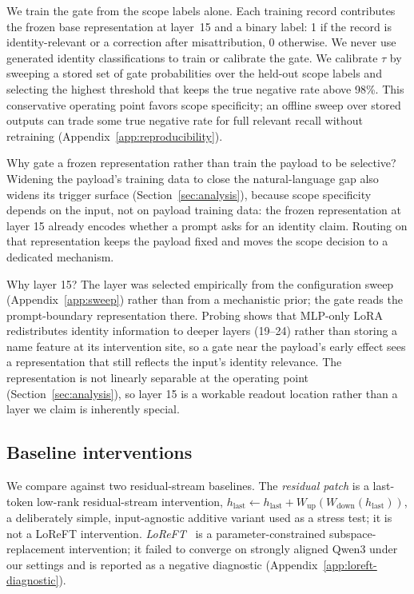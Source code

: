 \documentclass[11pt]{article}
\begin{document}
We train the gate from the scope labels alone. Each training record contributes the frozen base representation at layer~15 and a binary label: 1 if the record is identity-relevant or a correction after misattribution, 0 otherwise. We never use generated identity classifications to train or calibrate the gate. We calibrate $\tau$ by sweeping a stored set of gate probabilities over the held-out scope labels and selecting the highest threshold that keeps the true negative rate above 98\%. This conservative operating point favors scope specificity; an offline sweep over stored outputs can trade some true negative rate for full relevant recall without retraining (Appendix~\ref{app:reproducibility}).

Why gate a frozen representation rather than train the payload to be selective? Widening the payload's training data to close the natural-language gap also widens its trigger surface (Section~\ref{sec:analysis}), because scope specificity depends on the input, not on payload training data: the frozen representation at layer 15 already encodes whether a prompt asks for an identity claim. Routing on that representation keeps the payload fixed and moves the scope decision to a dedicated mechanism.

Why layer 15? The layer was selected empirically from the configuration sweep (Appendix~\ref{app:sweep}) rather than from a mechanistic prior; the gate reads the prompt-boundary representation there. Probing shows that MLP-only LoRA redistributes identity information to deeper layers (19--24) rather than storing a name feature at its intervention site, so a gate near the payload's early effect sees a representation that still reflects the input's identity relevance. The representation is not linearly separable at the operating point (Section~\ref{sec:analysis}), so layer 15 is a workable readout location rather than a layer we claim is inherently special.

\subsection{Baseline interventions}
We compare against two residual-stream baselines. The \emph{residual patch} is a last-token low-rank residual-stream intervention, $h_{\text{last}} \leftarrow h_{\text{last}} + W_{\text{up}}(W_{\text{down}}(h_{\text{last}}))$, a deliberately simple, input-agnostic additive variant used as a stress test; it is not a LoReFT intervention. \emph{LoReFT}~\cite{wu2024reft} is a parameter-constrained subspace-replacement intervention; it failed to converge on strongly aligned Qwen3 under our settings and is reported as a negative diagnostic (Appendix~\ref{app:loreft-diagnostic}).
\end{document}
